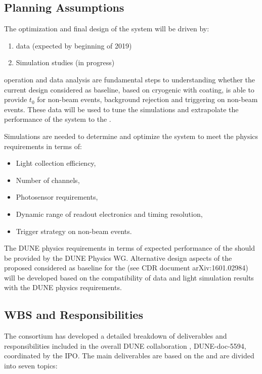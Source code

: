 \subsection{Planning Assumptions}
\label{sec:fddp-pd-12.2}

The optimization and final design of the \dual {} system will be driven by:
\begin{enumerate}
\item {} data (expected by beginning of 2019)
\item Simulation studies (in progress)
\end{enumerate}

 operation and data analysis are fundamental steps to understanding whether the current  design considered as baseline, based on cryogenic  with  coating, is able to provide $t_0$ for non-beam events, background rejection and triggering on non-beam events. These data will be used to tune the  simulations and extrapolate the performance of the system to the . 

Simulations are needed to determine and optimize the \dual {} system to meet the physics requirements in terms of:
\begin{itemize}
\item Light collection efficiency,
\item Number of channels,
\item Photosensor requirements,
\item Dynamic range of readout electronics and timing resolution,
\item Trigger strategy on non-beam events.
\end{itemize}

The DUNE physics requirements in terms of expected performance of the  should be provided by the DUNE Physics WG. Alternative design aspects of the proposed  considered as baseline for the  (see CDR document arXiv:1601.02984) will be developed based on the compatibility of  data and  light simulation results with the DUNE physics requirements.

\subsection{WBS and Responsibilities}
\label{sec:fddp-pd-12.3}

The \dual {} consortium has developed a detailed breakdown of deliverables and responsibilities included in the overall DUNE collaboration , DUNE-doc-5594, coordinated by the IPO. The main deliverables are based on the    and are divided into seven topics: 

